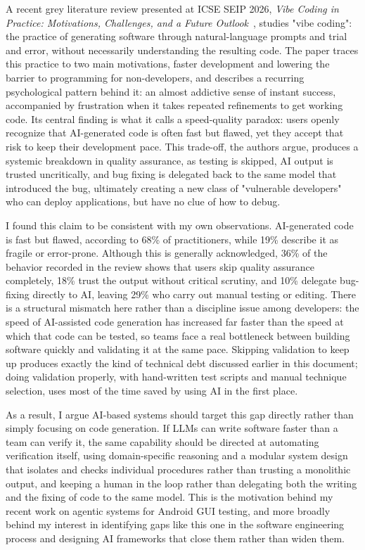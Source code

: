 \documentclass[11pt]{article}
\begin{document}
A recent grey literature review presented at ICSE SEIP 2026, \textit{Vibe Coding in Practice: Motivations, Challenges, and a Future Outlook}~\citep{fawzy2026vibe}, studies "vibe coding": the practice of generating software through natural-language prompts and trial and error, without necessarily understanding the resulting code. The paper traces this practice to two main motivations, faster development and lowering the barrier to programming for non-developers, and describes a recurring psychological pattern behind it: an almost addictive sense of instant success, accompanied by frustration when it takes repeated refinements to get working code. Its central finding is what it calls a speed-quality paradox: users openly recognize that AI-generated code is often fast but flawed, yet they accept that risk to keep their development pace. This trade-off, the authors argue, produces a systemic breakdown in quality assurance, as testing is skipped, AI output is trusted uncritically, and bug fixing is delegated back to the same model that introduced the bug, ultimately creating a new class of "vulnerable developers" who can deploy applications, but have no clue of how to debug.

I found this claim to be consistent with my own observations. AI-generated code is fast but flawed, according to 68\% of practitioners, while 19\% describe it as fragile or error-prone. Although this is generally acknowledged, 36\% of the behavior recorded in the review shows that users skip quality assurance completely, 18\% trust the output without critical scrutiny, and 10\% delegate bug-fixing directly to AI, leaving 29\% who carry out manual testing or editing. There is a structural mismatch here rather than a discipline issue among developers: the speed of AI-assisted code generation has increased far faster than the speed at which that code can be tested, so teams face a real bottleneck between building software quickly and validating it at the same pace. Skipping validation to keep up produces exactly the kind of technical debt discussed earlier in this document; doing validation properly, with hand-written test scripts and manual technique selection, uses most of the time saved by using AI in the first place.

As a result, I argue AI-based systems should target this gap directly rather than simply focusing on code generation. If LLMs can write software faster than a team can verify it, the same capability should be directed at automating verification itself, using domain-specific reasoning and a modular system design that isolates and checks individual procedures rather than trusting a monolithic output, and keeping a human in the loop rather than delegating both the writing and the fixing of code to the same model. This is the motivation behind my recent work on agentic systems for Android GUI testing, and more broadly behind my interest in identifying gaps like this one in the software engineering process and designing AI frameworks that close them rather than widen them.
\end{document}
